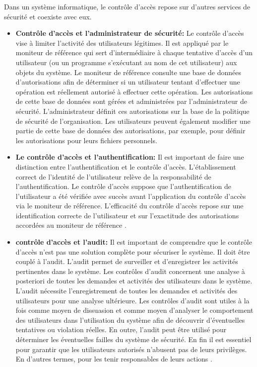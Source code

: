 \label{sectionAccès}
 Dans un système informatique, le contrôle d'accès repose sur d'autres services de sécurité et coexiste avec eux. 
\begin{itemize}

\item \textbf{Contrôle d'accès et l'administrateur de sécurité:} Le contrôle d'accès vise à limiter l'activité des utilisateurs légitimes. Il est appliqué par le moniteur de référence qui sert d'intermédiaire à chaque tentative d'accès d'un utilisateur (ou un programme s'exécutant au nom de cet utilisateur) aux objets du système. Le moniteur de référence consulte une base de données d'autorisations afin de déterminer si un utilisateur tentant d'effectuer une opération est réellement autorisé à effectuer cette opération. Les autorisations de cette base de données sont gérées et administrées par l'administrateur de sécurité. L'administrateur définit ces autorisations sur la base de la politique de sécurité de l'organisation. Les utilisateurs peuvent également modifier une partie de cette base de données des autorisations, par exemple, pour définir les autorisations pour leurs fichiers personnels\cite{sandhu94}. 


\item \textbf{Le contrôle d'accès et l'authentification:} Il est important de faire une distinction entre l'authentification et le contrôle d'accès. L'établissement correct de l'identité de l'utilisateur relève de la responsabilité de l'authentification. Le contrôle d'accès suppose que l'authentification  de l'utilisateur a été vérifiée avec succès avant l'application du contrôle d'accès via le moniteur de référence. L'efficacité du contrôle d'accès repose sur une identification correcte de l'utilisateur et sur l'exactitude des autorisations accordées au moniteur de référence \cite{sandhu94}.


\item \textbf{contrôle d'accès et l'audit:} Il est important de comprendre que le contrôle d'accès n'est pas une solution complète pour sécuriser le système. Il doit être couplé à l'audit. L'audit permet de surveiller et d'enregistrer les activités pertinentes dans le système. Les contrôles d'audit concernent une analyse à posteriori de toutes les demandes et activités des utilisateurs dans le système. L'audit nécessite l'enregistrement de toutes les demandes et activités des utilisateurs pour une analyse ultérieure. Les contrôles d'audit sont utiles à la fois comme moyen de dissuasion et comme moyen d'analyser le comportement des utilisateurs dans l'utilisation du système afin de découvrir d'éventuelles tentatives ou violation réelles.  En outre, l'audit peut être utilisé pour déterminer les éventuelles failles du système de sécurité. En fin il est essentiel pour garantir que les utilisateurs autorisés n'abusent pas de leurs privilèges. En d'autres termes, pour les tenir responsables de leurs actions \cite{sandhu94}.
\end{itemize} 

